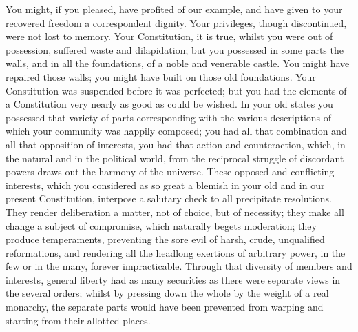 You might, if you pleased, have profited of our example, and have given to your recovered freedom a correspondent dignity. Your privileges, though discontinued, were not lost to memory. Your Constitution, it is true, whilst you were out of possession, suffered waste and dilapidation; but you possessed in some parts the walls, and in all the foundations, of a noble and venerable castle. You might have repaired those walls; you might have built on those old foundations. Your Constitution was suspended before it was perfected; but you had the elements of a Constitution very nearly as good as could be wished. In your old states you possessed that variety of parts corresponding with the various descriptions of which your community was happily composed; you had all that combination and all that opposition of interests, you had that action and counteraction, which, in the natural and in the political world, from the reciprocal struggle of discordant powers draws out the harmony of the universe. These opposed and conflicting interests, which you considered as so great a blemish in your old and in our present Constitution, interpose a salutary check to all precipitate resolutions. They render deliberation a matter, not of choice, but of necessity; they make all change a subject of compromise, which naturally begets moderation; they produce temperaments, preventing the sore evil of harsh, crude, unqualified reformations, and rendering all the headlong exertions of arbitrary power, in the few or in the many, forever impracticable. Through that diversity of members and interests, general liberty had as many securities as there were separate views in the several orders; whilst by pressing down the whole by the weight of a real monarchy, the separate parts would have been prevented from warping and starting from their allotted places.

